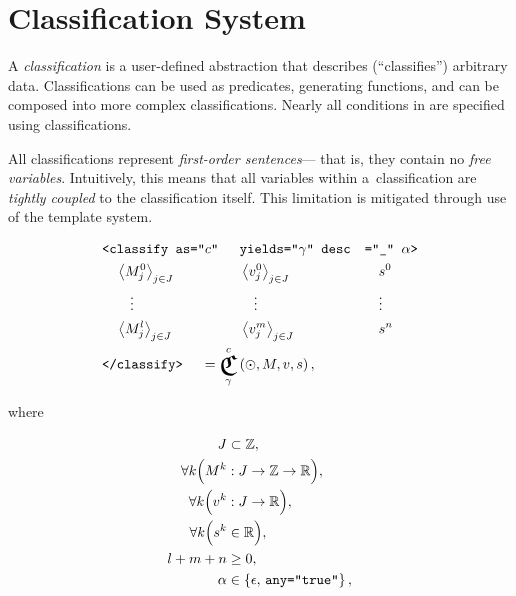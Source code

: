 
\section{Classification System}
A \emph{classification} is a user-defined abstraction that describes
  (``classifies'') arbitrary data.
Classifications can be used as predicates, generating functions, and can be
  composed into more complex classifications.
Nearly all conditions in \tame{} are specified using classifications.

All classifications represent \emph{first-order sentences}---%
  that is,
    they contain no \emph{free variables}.
Intuitively,
  this means that all variables within a~classification are
  \emph{tightly coupled} to the classification itself.
This limitation is mitigated through use of the template system.

\begin{definition}
\begin{alignat}{3}
    &\xml{<classify as="$c$" }&&\xml{yields="$\gamma$" desc}&&\xml{="$\_$"
          $\alpha$>}\label{eq:xml-classify} \\
    &\quad \VFam{M^0}jJ   &&\VFam{v^0}jJ   &&\quad s^0    \nonumber\\
    &\quad \quad\vdots    &&\quad\vdots    &&\quad \vdots \nonumber\\
    &\quad \VFam{M^l}jJ   &&\VFam{v^m}jJ   &&\quad s^n    \nonumber\\
    &\xml{</classify>}
      &&\mspace{-50mu}= \Classify^c_\gamma\left(\odot,M,v,s\right), \nonumber
\end{alignat}

\noindent
where

\begin{align}
    J &\subset\mathbb{Z}, \\
    \forall{k}\Big(M^k &: J \rightarrow \mathbb{Z} \rightarrow \mathbb{R}\Big),
                                            \label{eq:class-matrix} \\
    \forall{k}\Big(v^k &: J \rightarrow \mathbb{R}\Big), \\
    \forall{k}\Big(s^k &\in\mathbb{R}\Big), \\
    l+m+n &\geq 0, \label{eq:mvs-opt} \\
    \alpha &\in\left\{\epsilon,\, \texttt{any="true"}\right\}, \label{eq:xml-any-domain}
\end{align}
\end{definition}

